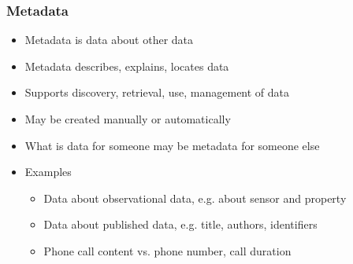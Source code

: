 \documentclass{beamer}
\begin{document}
\begin{frame}
  \frametitle{Metadata}
  
  \begin{itemize}
  \item Metadata is data about other data
  \item Metadata describes, explains, locates data
  \item Supports discovery, retrieval, use, management of data
  \item May be created manually or automatically
  \item What is data for someone may be metadata for someone else
  \item Examples
  \begin{itemize}
    \item Data about observational data, e.g. about sensor and property
    \item Data about published data, e.g. title, authors, identifiers
    \item Phone call content vs. phone number, call duration
  \end{itemize}
  \end{itemize}
\end{frame}

  
\end{document}

